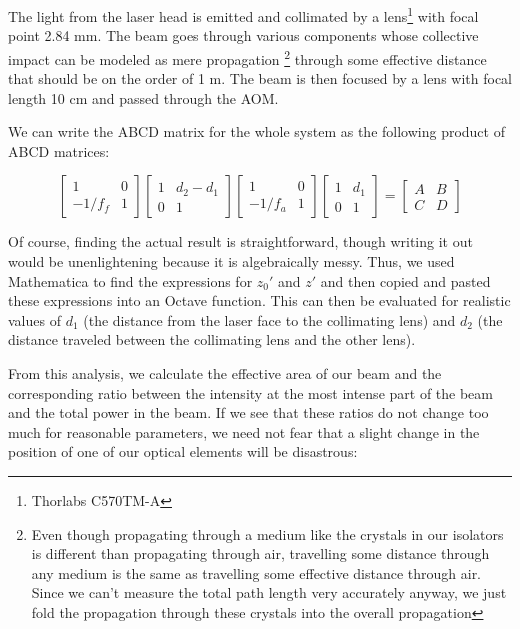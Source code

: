 The light from the laser head is emitted and collimated by a lens\footnote{Thorlabs C570TM-A} with focal point 2.84 mm.%
 The beam goes through various components whose collective impact can be modeled as mere propagation 
\footnote{Even though propagating through a medium like the crystals in our isolators is different than propagating through air, travelling some distance through any medium is the same as travelling some effective distance through air. Since we can't measure the total path length very accurately anyway, we just fold the propagation through these crystals into the overall propagation}
through some effective distance that should be on the order of 1 m. The beam is then focused by a lens with focal length 10 cm and passed through the AOM. 

We can write the ABCD matrix for the whole system as the following product of ABCD matrices: 

\begin{equation}
\begin{bmatrix}
1 & 0 \\ -1/f_{f} & 1
\end{bmatrix}
\begin{bmatrix}
1 & d_2-d_1 \\ 0 & 1
\end{bmatrix}
\begin{bmatrix}
1 & 0 \\ -1/f_{a} & 1
\end{bmatrix}
\begin{bmatrix}
1 & d_1 \\ 0 & 1
\end{bmatrix}
=
\begin{bmatrix}
A & B \\ C & D
\end{bmatrix}
\end{equation}

Of course, finding the actual result is straightforward, though writing it out would be unenlightening because it is algebraically messy. Thus, we used Mathematica to find the expressions for $z_0'$ and $z'$ and then copied and pasted these expressions into an Octave function. This can then be evaluated for realistic values of $d_1$ (the distance from the laser face to the collimating lens) and $d_2$ (the distance traveled between the collimating lens and the other lens). 

From this analysis, we calculate the effective area of our beam and the corresponding ratio between the intensity at the most intense part of the beam and the total power in the beam. If we see that these ratios do not change too much for reasonable parameters, we need not fear that a slight change in the position of one of our optical elements will be disastrous:


